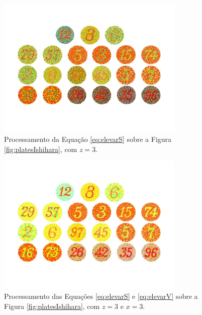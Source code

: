 \documentclass[	12pt, Times, openright, twoside, a4paper, english, brazil]{abntex2}
\begin{document}
\begin{figure}[!htb]
\centering \includegraphics[width=0.80\textwidth]{figuraElevarS.jpg}
\caption{Processamento da Equação \ref{eq:elevarS} sobre a Figura \ref{fig:platesIshihara}, com $z = 3$. \label{fig:figuraElevarS}}
\end{figure}

\begin{figure}[!htb]
\centering \includegraphics[width=0.80\textwidth]{figuraElevarSeV.jpg}
\caption{Processamento das Equações \ref{eq:elevarS} e \ref{eq:elevarV} sobre a Figura \ref{fig:platesIshihara}, com $z = 3$ e $x = 3$. \label{fig:figuraElevarSeV}}
\end{figure}
\end{document}
